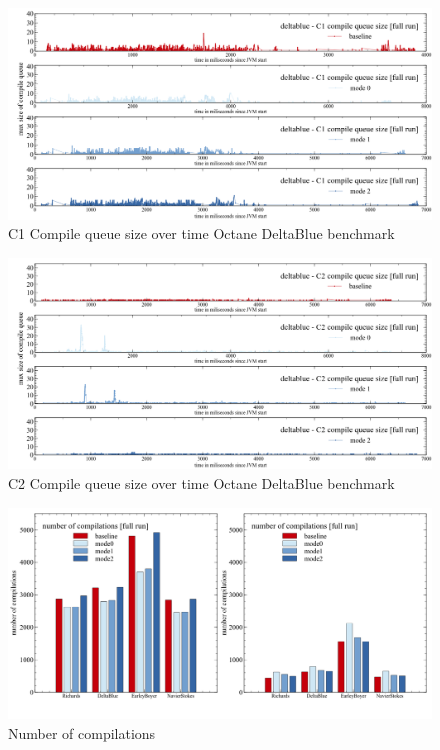 \begin{figure}[ht]
  \begin{center}
    \centering
    \includegraphics[width=1.0\textwidth]{figures/octane_queue_deltablue_separate_c1.png}
    \caption{C1 Compile queue size over time Octane DeltaBlue benchmark}
    \label{f:octane_queue_deltablue_separate_c1}
  \end{center}
\end{figure}
\begin{figure}[ht]
  \begin{center}
    \centering
    \includegraphics[width=1.0\textwidth]{figures/octane_queue_deltablue_separate_c2.png}
    \caption{C2 Compile queue size over time Octane DeltaBlue benchmark}
    \label{f:octane_queue_deltablue_separate_c2}
  \end{center}
\end{figure}
\begin{figure}[ht]
  \begin{center}
    \centering
    \includegraphics[width=1.0\textwidth]{figures/queue_total.png}
    \caption{Number of compilations}
    \label{f:queue_total}
  \end{center}
\end{figure}
